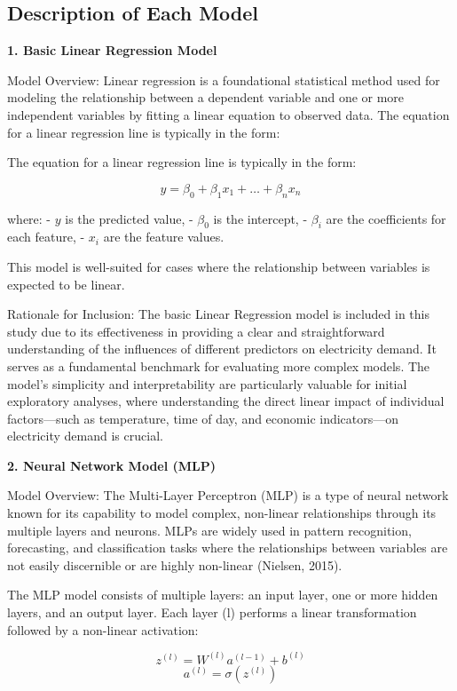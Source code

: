\documentclass[
]{article}
\begin{document}
\subsection{Description of Each Model}\label{description-of-each-model}

\textbf{1. Basic Linear Regression Model}

Model Overview: Linear regression is a foundational statistical method
used for modeling the relationship between a dependent variable and one
or more independent variables by fitting a linear equation to observed
data. The equation for a linear regression line is typically in the
form:

The equation for a linear regression line is typically in the form:

\[ y = \beta_0 + \beta_1 x_1 + \dots + \beta_n x_n \]

where: - \(y\) is the predicted value, - \(\beta_0\) is the intercept, -
\(\beta_i\) are the coefficients for each feature, - \(x_i\) are the
feature values.

This model is well-suited for cases where the relationship between
variables is expected to be linear.

Rationale for Inclusion: The basic Linear Regression model is included
in this study due to its effectiveness in providing a clear and
straightforward understanding of the influences of different predictors
on electricity demand. It serves as a fundamental benchmark for
evaluating more complex models. The model's simplicity and
interpretability are particularly valuable for initial exploratory
analyses, where understanding the direct linear impact of individual
factors---such as temperature, time of day, and economic indicators---on
electricity demand is crucial.

\textbf{2. Neural Network Model (MLP)}

Model Overview: The Multi-Layer Perceptron (MLP) is a type of neural
network known for its capability to model complex, non-linear
relationships through its multiple layers and neurons. MLPs are widely
used in pattern recognition, forecasting, and classification tasks where
the relationships between variables are not easily discernible or are
highly non-linear (Nielsen, 2015).

The MLP model consists of multiple layers: an input layer, one or more
hidden layers, and an output layer. Each layer (l) performs a linear
transformation followed by a non-linear activation:

\[ z^{(l)} = W^{(l)}a^{(l-1)} + b^{(l)} \]
\[ a^{(l)} = \sigma(z^{(l)}) \]
\end{document}
